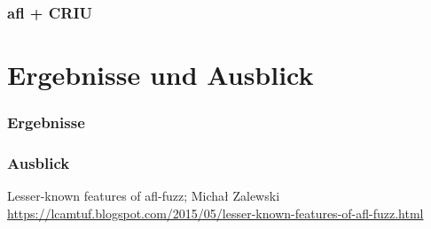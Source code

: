 \documentclass[handout]{beamer}
\begin{document}
\begin{frame}
    \frametitle{afl + CRIU}
\end{frame}

\section{Ergebnisse und Ausblick}

\begin{frame}
    \frametitle{Ergebnisse}
\end{frame}

\begin{frame}
    \frametitle{Ausblick}
\end{frame}

\begin{frame}

\end{frame}

\begin{thebibliography}{}
    Lesser-known features of afl-fuzz; Michał Zalewski \url{https://lcamtuf.blogspot.com/2015/05/lesser-known-features-of-afl-fuzz.html}
\end{thebibliography}
\end{document}
